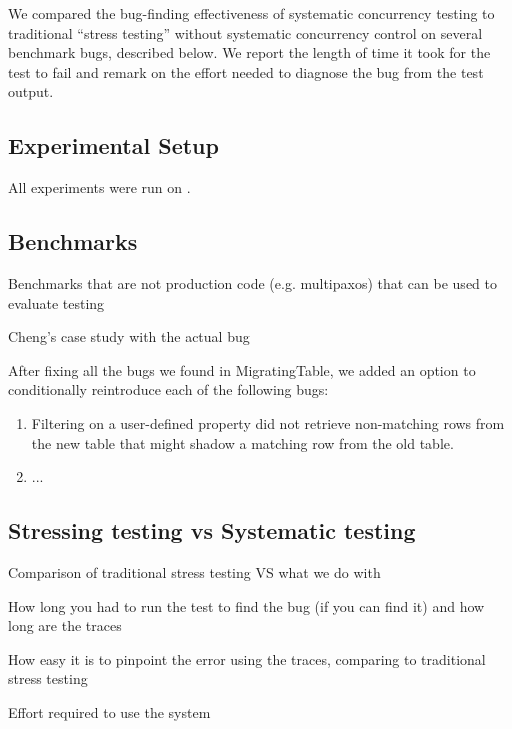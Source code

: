 We compared the bug-finding effectiveness of \psharp systematic concurrency testing to traditional ``stress testing'' without systematic concurrency control on several benchmark bugs, described below.  We report the length of time it took for the test to fail and remark on the effort needed to diagnose the bug from the test output. 

\subsection{Experimental Setup}

All experiments were run on . 

\subsection{Benchmarks}

Benchmarks that are not production code (e.g. multipaxos) that can be used to evaluate testing

Cheng's case study with the actual bug

After fixing all the bugs we found in MigratingTable, we added an option to conditionally reintroduce each of the following bugs:
\begin{enumerate}
\item Filtering on a user-defined property did not retrieve non-matching rows from the new table that might shadow a matching row from the old table.
\item ...
\end{enumerate}

\subsection{Stressing testing vs Systematic testing}

Comparison of traditional stress testing VS what we do with \psharp

How long you had to run the test to find the bug (if you can find it) and how long are the traces

How easy it is to pinpoint the error using the \psharp traces, comparing to traditional stress testing

Effort required to use the system
